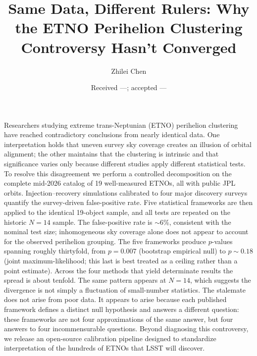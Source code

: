 \documentclass{aa}
\begin{document}
\title{Same Data, Different Rulers: Why the ETNO Perihelion Clustering Controversy Hasn't Converged}

\author{Zhilei Chen}

\date{Received ---; accepted ---}

\abstract
{Researchers studying extreme trans-Neptunian (ETNO) perihelion clustering have reached contradictory conclusions from nearly identical data. One interpretation holds that uneven survey sky coverage creates an illusion of orbital alignment; the other maintains that the clustering is intrinsic and that significance varies only because different studies apply different statistical tests.}
{To resolve this disagreement we perform a controlled decomposition on the complete mid-2026 catalog of 19 well-measured ETNOs, all with public JPL orbits.}
{Injection--recovery simulations calibrated to four major discovery surveys quantify the survey-driven false-positive rate. Five statistical frameworks are then applied to the identical 19-object sample, and all tests are repeated on the historic $N=14$ sample.}
{The false-positive rate is $\sim$6\%, consistent with the nominal test size; inhomogeneous sky coverage alone does not appear to account for the observed perihelion grouping. The five frameworks produce $p$-values spanning roughly thirtyfold, from $p=0.007$ (bootstrap empirical null) to $p\sim0.18$ (joint maximum-likelihood; this last is best treated as a ceiling rather than a point estimate). Across the four methods that yield determinate results the spread is about tenfold. The same pattern appears at $N=14$, which suggests the divergence is not simply a fluctuation of small-number statistics.}
{The stalemate does not arise from poor data. It appears to arise because each published framework defines a distinct null hypothesis and answers a different question: these frameworks are not four approximations of the same answer, but four answers to four incommensurable questions. Beyond diagnosing this controversy, we release an open-source calibration pipeline designed to standardize interpretation of the hundreds of ETNOs that LSST will discover.}
\end{document}
